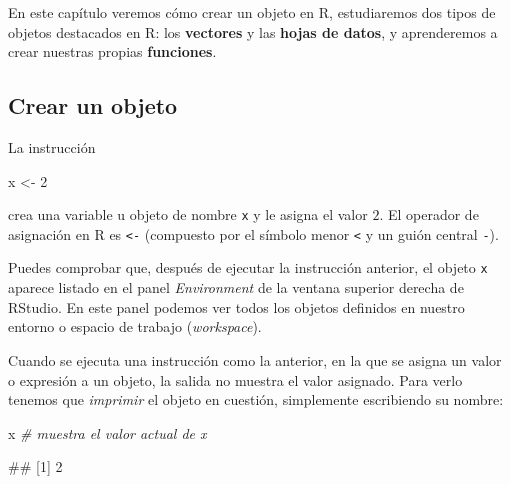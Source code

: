 \documentclass[
  title=normal,
  notoc,
  bib=normal]{mnye}
\newenvironment{Shaded}{\begin{snugshade}}{\end{snugshade}}
\newcommand{\CommentTok}[1]{\textcolor[rgb]{0.56,0.35,0.01}{\textit{#1}}}
\newcommand{\DecValTok}[1]{\textcolor[rgb]{0.00,0.00,0.81}{#1}}
\newcommand{\NormalTok}[1]{#1}
\newcommand{\OtherTok}[1]{\textcolor[rgb]{0.56,0.35,0.01}{#1}}
\begin{document}
En este capítulo veremos cómo crear un objeto en \textsf{R}, estudiaremos dos tipos de objetos destacados en \textsf{R}: los \textbf{vectores} y las \textbf{hojas de datos}, y aprenderemos a crear nuestras propias \textbf{funciones}.

\hypertarget{crear-un-objeto}{%
\subsection{Crear un objeto}\label{crear-un-objeto}}

La instrucción

\begin{Shaded}
\begin{Highlighting}[]
\NormalTok{x }\OtherTok{\textless{}{-}} \DecValTok{2}
\end{Highlighting}
\end{Shaded}

crea una variable u objeto de nombre \texttt{x} y le asigna el valor \(2\).
El operador de asignación en \textsf{R} es \texttt{\textless{}-} (compuesto por el símbolo menor \texttt{\textless{}} y un guión central \texttt{-}).

Puedes comprobar que, después de ejecutar la instrucción anterior, el objeto \texttt{x} aparece listado en el panel \emph{Environment} de la ventana superior derecha de \textsf{RStudio}. En este panel podemos ver todos los objetos definidos en nuestro entorno o espacio de trabajo (\emph{workspace}).

Cuando se ejecuta una instrucción como la anterior, en la que se asigna un valor o expresión a un objeto, la salida no muestra el valor asignado. Para verlo tenemos que \emph{imprimir} el objeto en cuestión, simplemente escribiendo su nombre:

\begin{Shaded}
\begin{Highlighting}[]
\NormalTok{x }\CommentTok{\# muestra el valor actual de x}
\end{Highlighting}
\end{Shaded}

\begin{Shaded}
\begin{Highlighting}[]
\NormalTok{\#\# [1] 2}
\end{Highlighting}
\end{Shaded}
\end{document}
